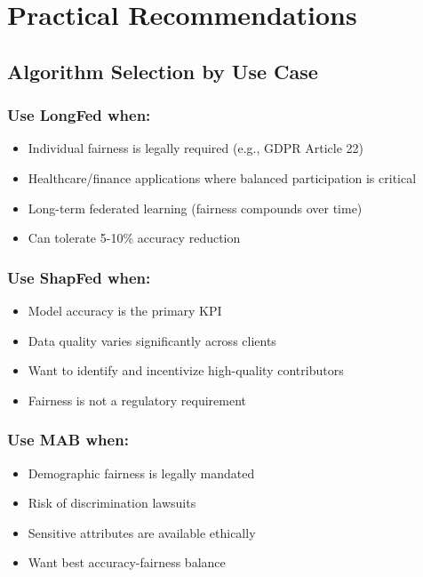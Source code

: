 \documentclass{article}
\begin{document}
\section{Practical Recommendations}

\subsection{Algorithm Selection by Use Case}

\subsubsection{Use LongFed when:}
\begin{itemize}
    \item Individual fairness is legally required (e.g., GDPR Article 22)
    \item Healthcare/finance applications where balanced participation is critical
    \item Long-term federated learning (fairness compounds over time)
    \item Can tolerate 5-10\% accuracy reduction
\end{itemize}

\subsubsection{Use ShapFed when:}
\begin{itemize}
    \item Model accuracy is the primary KPI
    \item Data quality varies significantly across clients
    \item Want to identify and incentivize high-quality contributors
    \item Fairness is not a regulatory requirement
\end{itemize}

\subsubsection{Use MAB when:}
\begin{itemize}
    \item Demographic fairness is legally mandated
    \item Risk of discrimination lawsuits
    \item Sensitive attributes are available ethically
    \item Want best accuracy-fairness balance
\end{itemize}
\end{document}
